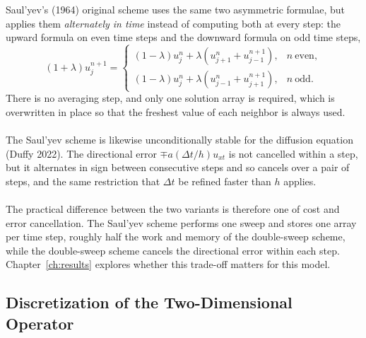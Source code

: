 \documentclass[12pt,a4paper]{article}
\begin{document}
Saul'yev's (1964) original scheme uses the same two asymmetric formulae, but applies them \emph{alternately in time} instead of computing both at every step: the upward formula on even time steps and the downward formula on odd time steps,
\begin{equation}
(1+\lambda)u_j^{n+1}=\begin{cases}(1-\lambda)u_j^n+\lambda\left(u_{j+1}^{n}+u_{j-1}^{n+1}\right), & n\ \text{even},\\[2pt](1-\lambda)u_j^n+\lambda\left(u_{j-1}^{n}+u_{j+1}^{n+1}\right), & n\ \text{odd}.\end{cases}
\end{equation}
There is no averaging step, and only one solution array is required, which is overwritten in place so that the freshest value of each neighbor is always used.\\\\
The Saul'yev scheme is likewise unconditionally stable for the diffusion equation (Duffy 2022). The directional error $\mp a(\Delta t/h)u_{xt}$ is not cancelled within a step, but it alternates in sign between consecutive steps and so cancels over a pair of steps, and the same restriction that $\Delta t$ be refined faster than $h$ applies. \\\\
The practical difference between the two variants is therefore one of cost and error cancellation. The Saul'yev scheme performs one sweep and stores one array per time step, roughly half the work and memory of the double-sweep scheme, while the double-sweep scheme cancels the directional error within each step. Chapter~\ref{ch:results} explores whether this trade-off matters for this model.

\subsection{Discretization of the Two-Dimensional Operator}\label{sec:disc2d}
\end{document}
